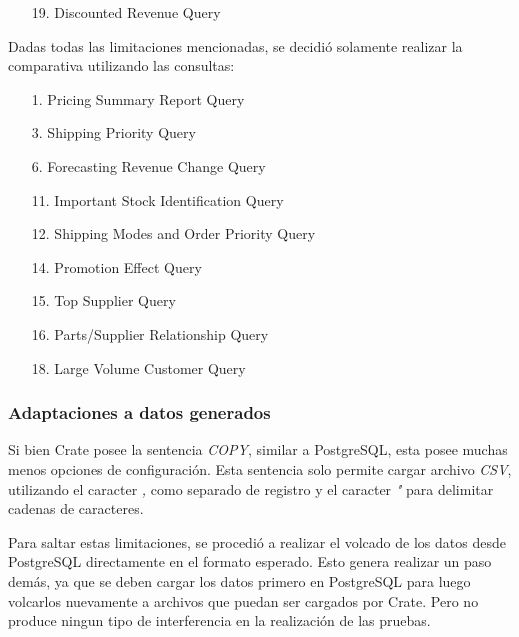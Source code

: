\documentclass[11pt, twocolumns]{article}
\begin{document}
\begin{multicols}{2}
\begin{itemize}
  \item [19.] Discounted Revenue Query
\end{itemize}
Dadas todas las limitaciones mencionadas, se decidió solamente realizar la comparativa utilizando las consultas:
\begin{itemize}
  \item [1.] Pricing Summary Report Query
  \item [3.] Shipping Priority Query
  \item [6.] Forecasting Revenue Change Query
  \item [11.] Important Stock Identification Query
  \item [12.] Shipping Modes and Order Priority Query
  \item [14.] Promotion Effect Query
  \item [15.] Top Supplier Query
  \item [16.] Parts/Supplier Relationship Query
  \item [18.] Large Volume Customer Query
\end{itemize}

\subsubsection{Adaptaciones a datos generados}
Si bien Crate posee la sentencia \textit{COPY}, similar a PostgreSQL, esta posee muchas menos opciones de configuración. Esta sentencia solo permite cargar archivo \textit{CSV}, utilizando el caracter \textit{,} como separado de registro y el caracter \textit{"} para delimitar cadenas de caracteres.
\par
Para saltar estas limitaciones, se procedió a realizar el volcado de los datos desde PostgreSQL directamente en el formato esperado. Esto genera realizar un paso demás, ya que se deben cargar los datos primero en PostgreSQL para luego volcarlos nuevamente a archivos que puedan ser cargados por Crate. Pero no produce ningun tipo de interferencia en la realización de las pruebas. 



\end{multicols}
\end{document}
